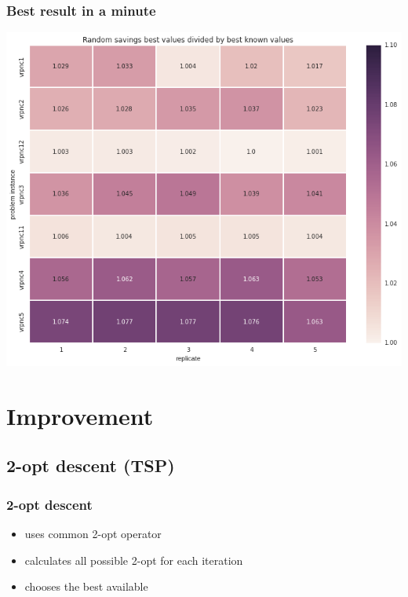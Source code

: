 \documentclass{beamer}
\begin{document}
\begin{frame}
\frametitle{Best result in a minute}
\begin{center}
\includegraphics[scale=0.25]{figs/rs_best}

\end{center}
\end{frame}

\section{Improvement}
\subsection{2-opt descent (TSP)}

\begin{frame}
\frametitle{2-opt descent}
\begin{itemize}
	\item uses common 2-opt operator
	\item calculates all possible 2-opt for each iteration
	\item chooses the best available
\end{itemize}
\end{frame}
\end{document}
